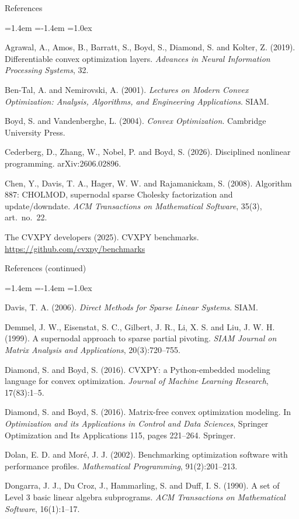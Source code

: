 \documentclass[10pt,mathserif,aspectratio=169]{beamer}
\begin{document}
\begin{frame}[label=bk-refs]{References}
\vspace{-0.5ex}
{\footnotesize
\begin{list}{}{\leftmargin=1.4em \itemindent=-1.4em \itemsep=1.0ex
               \parsep=0pt \topsep=0pt}
\item Agrawal, A., Amos, B., Barratt, S., Boyd, S., Diamond, S. and Kolter, Z. (2019).
      Differentiable convex optimization layers. \emph{Advances in Neural Information
      Processing Systems}, 32.
\item Ben-Tal, A. and Nemirovski, A. (2001). \emph{Lectures on Modern Convex Optimization:
      Analysis, Algorithms, and Engineering Applications}. SIAM.
\item Boyd, S. and Vandenberghe, L. (2004). \emph{Convex Optimization}. Cambridge University
      Press.
\item Cederberg, D., Zhang, W., Nobel, P. and Boyd, S. (2026). Disciplined nonlinear
      programming. arXiv:2606.02896.
\item Chen, Y., Davis, T. A., Hager, W. W. and Rajamanickam, S. (2008). Algorithm 887:
      CHOLMOD, supernodal sparse Cholesky factorization and update/downdate. \emph{ACM
      Transactions on Mathematical Software}, 35(3), art.\ no.\ 22.
\item The CVXPY developers (2025). CVXPY benchmarks.
      \url{https://github.com/cvxpy/benchmarks}
\end{list}}
\end{frame}

\begin{frame}{References (continued)}
\vspace{-0.5ex}
{\footnotesize
\begin{list}{}{\leftmargin=1.4em \itemindent=-1.4em \itemsep=1.0ex
               \parsep=0pt \topsep=0pt}
\item Davis, T. A. (2006). \emph{Direct Methods for Sparse Linear Systems}. SIAM.
\item Demmel, J. W., Eisenstat, S. C., Gilbert, J. R., Li, X. S. and Liu, J. W. H. (1999).
      A supernodal approach to sparse partial pivoting. \emph{SIAM Journal on Matrix Analysis
      and Applications}, 20(3):720--755.
\item Diamond, S. and Boyd, S. (2016). CVXPY: a Python-embedded modeling language for convex
      optimization. \emph{Journal of Machine Learning Research}, 17(83):1--5.
\item Diamond, S. and Boyd, S. (2016). Matrix-free convex optimization modeling. In
      \emph{Optimization and its Applications in Control and Data Sciences}, Springer
      Optimization and Its Applications 115, pages 221--264. Springer.
\item Dolan, E. D. and Mor\'e, J. J. (2002). Benchmarking optimization software with
      performance profiles. \emph{Mathematical Programming}, 91(2):201--213.
\item Dongarra, J. J., Du Croz, J., Hammarling, S. and Duff, I. S. (1990). A set of Level 3
      basic linear algebra subprograms. \emph{ACM Transactions on Mathematical Software},
      16(1):1--17.
\end{list}}
\end{frame}
\end{document}
